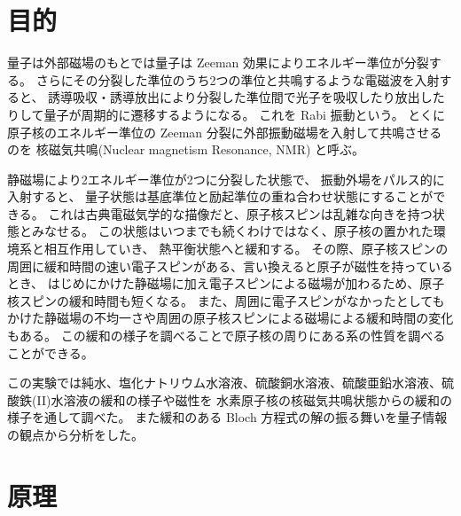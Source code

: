 \documentclass[11pt,dvipdfmx,a4paper]{jsarticle}
\begin{document}
\section{目的}
量子は外部磁場のもとでは量子は Zeeman 効果によりエネルギー準位が分裂する。
さらにその分裂した準位のうち2つの準位と共鳴するような電磁波を入射すると、
誘導吸収・誘導放出により分裂した準位間で光子を吸収したり放出したりして量子が周期的に遷移するようになる。
これを Rabi 振動という。
とくに原子核のエネルギー準位の Zeeman 分裂に外部振動磁場を入射して共鳴させるのを
核磁気共鳴(Nuclear magnetism Resonance, NMR) と呼ぶ。

静磁場により2エネルギー準位が2つに分裂した状態で、
振動外場をパルス的に入射すると、
量子状態は基底準位と励起準位の重ね合わせ状態にすることができる。
これは古典電磁気学的な描像だと、原子核スピンは乱雑な向きを持つ状態とみなせる。
この状態はいつまでも続くわけではなく、原子核の置かれた環境系と相互作用していき、
熱平衡状態へと緩和する。
その際、原子核スピンの周囲に緩和時間の速い電子スピンがある、言い換えると原子が磁性を持っているとき、
はじめにかけた静磁場に加え電子スピンによる磁場が加わるため、原子核スピンの緩和時間も短くなる。
また、周囲に電子スピンがなかったとしてもかけた静磁場の不均一さや周囲の原子核スピンによる磁場による緩和時間の変化もある。
この緩和の様子を調べることで原子核の周りにある系の性質を調べることができる。

この実験では純水、塩化ナトリウム水溶液、硫酸銅水溶液、硫酸亜鉛水溶液、硫酸鉄(II)水溶液の緩和の様子や磁性を
水素原子核の核磁気共鳴状態からの緩和の様子を通して調べた。
また緩和のある Bloch 方程式の解の振る舞いを量子情報の観点から分析をした。

\section{原理}
\end{document}
